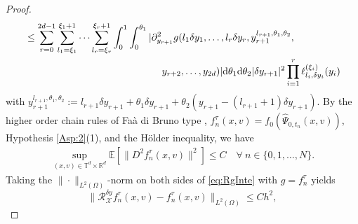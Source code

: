 \documentclass[11pt,reqno]{amsproc}
\newcommand{\ud}{\mathrm d}
\numberwithin{equation}{section}
\newcommand{\E}{\mathbb{E}}\allowdisplaybreaks[4]
\begin{document}
\begin{proof}
\begin{align}
&\le \sum_{r=0}^{2d-1}\sum_{l_1=\xi_1}^{\xi_1+1}\cdots\sum_{l_r=\xi_r}^{\xi_r+1}
\int_0^1\int_0^{\theta_1}|\partial_{y_{r+1}}^2g(l_1\delta y_1,\ldots,l_r\delta y_r,y^{l_{r+1},\theta_1,\theta_2}_{r+1},\\\notag
&\qquad\qquad\qquad\qquad\qquad\qquad\qquad y_{r+2},\ldots,y_{2d})|\ud\theta_1\ud\theta_2|\delta y_{r+1}|^2
\prod_{i=1}^r\ell^{(\xi_i)}_{l_i,\delta y_i}(y_i)
\end{align}
with
$y^{l_{r+1},\theta_1,\theta_2}_{r+1}:=l_{r+1}\delta y_{r+1}+
\theta_1\delta y_{r+1}+\theta_2(y_{r+1}-(l_{r+1}+1)\delta y_{r+1})$. By the higher order
chain rules of Faà di Bruno type \cite{MR00}, $f_n^\tau(x,v)=f_0(\widehat{\Psi}_{0,t_n}(x,v))$, Hypothesis \ref{Asp:2}(1), and the H\"older inequality, we have
\begin{gather*}
\sup_{(x,v)\in\mathbb{T}^d\times\mathbb{R}^d}\E\left[\|D^2 f_n^\tau(x,v)\|^2\right]\le C\quad\forall~n\in\{0,1,\ldots,N\}.
\end{gather*}
Taking the $\|\cdot\|_{L^2(\Omega)}$-norm on both sides of \eqref{eq:RgInte} with $g=f_n^\tau$ yields
\begin{equation}\label{eq:IntererrorX}
\|\mathscr{R}_{\mathscr{X}}^{\delta y}f^\tau_n(x,v)- f_{n}^\tau(x,v)\|_{L^2(\Omega)}
\le Ch^2,
\end{equation}


\end{proof}
\end{document}
